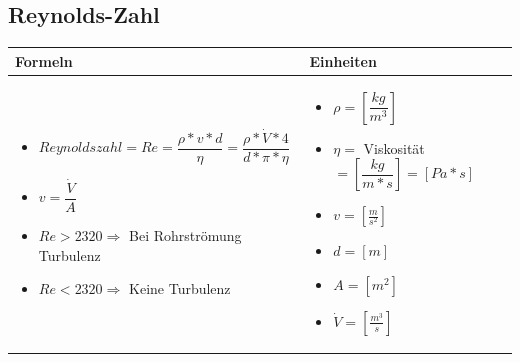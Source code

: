 \subsection{Reynolds-Zahl}				%
\begin{table}[h!]
	\begin{tabular}{ | m{9cm} | m{9cm}  | }
		\hline
		Formeln & Einheiten \\ \hline
		\midrule
		\begin{itemize}
			\item $Reynoldszahl=Re=\dfrac{\rho*v*d}{\eta}=\dfrac{\rho*\dot{V}*4}{d*\pi*\eta}$	
			\item $v=\dfrac{\dot{V}}{A}$
			\item $Re>2320\Rightarrow$ Bei Rohrströmung Turbulenz
			\item $Re<2320\Rightarrow$ Keine Turbulenz
		\end{itemize}
		&
		\begin{itemize}
			\item $\rho=[\dfrac{kg}{m^3}]$
			\item $\eta=$ Viskosität $=[\dfrac{kg}{m*s}]=[Pa*s]$
			\item $v=[\frac{m}{s^2}]$
			\item $d=[m]$
			\item $A=[m^2]$
			\item $\dot{V}=[\frac{m^3}{s}]$
			
		\end{itemize}
		\\ \hline
	\end{tabular}
\end{table}
